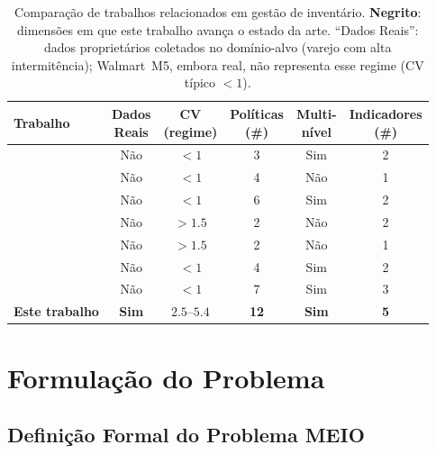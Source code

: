 \documentclass[a4paper,11pt]{article}
\begin{document}
\begin{table}[ht]
\centering
\small
\caption{Comparação de trabalhos relacionados em gestão de inventário.
\textbf{Negrito}: dimensões em que este trabalho avança o estado da arte.
``Dados Reais'': dados proprietários coletados no domínio-alvo
(varejo com alta intermitência); Walmart~M5, embora real, não
representa esse regime (CV típico $<1$).}
\label{tab:relwork}
\begin{tabular}{@{}lccccc@{}}
\toprule
Trabalho &
\makecell[c]{Dados\\Reais} &
\makecell[c]{CV\\(regime)} &
\makecell[c]{Políticas\\(\#)} &
\makecell[c]{Multi-\\nível} &
\makecell[c]{Indicadores\\(\#)} \\
\midrule
\citealt{oroojlooyjadid:2022} & Não & $<1$         &  3 & Sim & 2 \\
\citealt{vanvuchelen:2020}    & Não & $<1$         &  4 & Não & 1 \\
\citealt{gijsbrechts:2022}    & Não & $<1$         &  6 & Sim & 2 \\
\citealt{yuna:2023}           & Não & $>1.5$       &  2 & Não & 2 \\
\citealt{erkayman:2025}       & Não & $>1.5$       &  2 & Não & 1 \\
\citealt{liu:2024}            & Não & $<1$         &  4 & Sim & 2 \\
\citealt{zabraoui:2025}       & Não & $<1$         &  7 & Sim & 3 \\
\midrule
\textbf{Este trabalho}
  & \textbf{Sim}
  & $\mathbf{2.5}$--$\mathbf{5.4}$
  & \textbf{12}
  & \textbf{Sim}
  & \textbf{5} \\
\bottomrule
\end{tabular}
\end{table}

\section{Formulação do Problema}

\subsection{Definição Formal do Problema MEIO}
\end{document}
